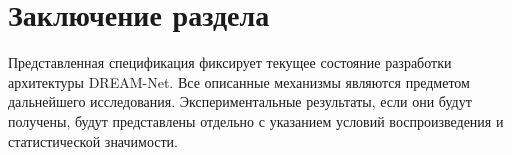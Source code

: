 \section{Заключение раздела}

Представленная спецификация фиксирует текущее состояние разработки архитектуры DREAM-Net. Все описанные механизмы являются предметом дальнейшего исследования. Экспериментальные результаты, если они будут получены, будут представлены отдельно с указанием условий воспроизведения и статистической значимости.
